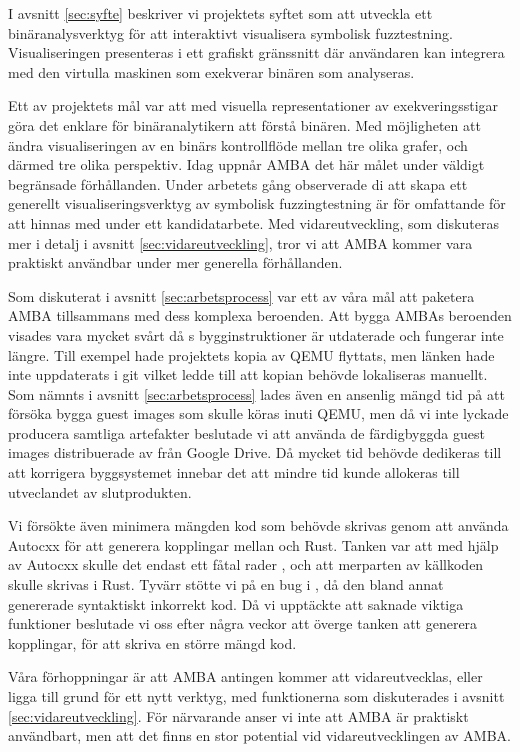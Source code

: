 I avsnitt \ref{sec:syfte} beskriver vi projektets syftet som att utveckla ett
binäranalysverktyg för att interaktivt visualisera symbolisk fuzztestning.
Visualiseringen presenteras i ett grafiskt gränssnitt där användaren kan
integrera med den virtulla maskinen som exekverar binären som analyseras.

Ett av projektets mål var att med visuella representationer av exekveringsstigar
göra det enklare för binäranalytikern att förstå binären. Med möjligheten att
ändra visualiseringen av en binärs kontrollflöde mellan tre olika grafer, och därmed
tre olika perspektiv. Idag uppnår AMBA det här målet under väldigt begränsade
förhållanden. Under arbetets gång observerade di att skapa ett generellt
visualiseringsverktyg av symbolisk fuzzingtestning är för omfattande för att
hinnas med under ett kandidatarbete. Med vidareutveckling, som diskuteras mer
i detalj i avsnitt \ref{sec:vidareutveckling}, tror vi att AMBA kommer vara
praktiskt användbar under mer generella förhållanden.

Som diskuterat i avsnitt \ref{sec:arbetsprocess} var ett av våra mål att
paketera AMBA tillsammans med dess komplexa beroenden. Att bygga AMBAs beroenden
visades vara mycket svårt då \stoe{}s bygginstruktioner är utdaterade och
fungerar inte längre. Till exempel hade \stoe{} projektets kopia av QEMU
flyttats, men länken hade inte uppdaterats i git vilket ledde till att kopian
behövde lokaliseras manuellt. Som nämnts i avsnitt \ref{sec:arbetsprocess} lades
även en ansenlig mängd tid på att försöka bygga guest images som skulle köras
inuti QEMU, men då vi inte lyckade producera samtliga artefakter beslutade vi
att använda de färdigbyggda guest images distribuerade av \stoe{} från Google
Drive. Då mycket tid behövde dedikeras till att korrigera byggsystemet innebar
det att mindre tid kunde allokeras till utveclandet av slutprodukten.

Vi försökte även minimera mängden  kod som behövde skrivas genom
att använda Autocxx för att generera kopplingar mellan  och Rust.
Tanken var att med hjälp av Autocxx skulle det endast ett fåtal rader
, och att merparten av källkoden skulle skrivas i Rust. Tyvärr
stötte vi på en bug i , då den bland annat genererade
syntaktiskt inkorrekt kod. Då vi upptäckte att  saknade
viktiga funktioner beslutade vi oss efter några veckor att överge tanken att
generera kopplingar, för att skriva en större mängd  kod.

Våra förhoppningar är att AMBA antingen kommer att vidareutvecklas, eller ligga
till grund för ett nytt verktyg, med funktionerna som diskuterades i avsnitt
\ref{sec:vidareutveckling}. För närvarande anser vi inte att AMBA är praktiskt
användbart, men att det finns en stor potential vid vidareutvecklingen av AMBA.
